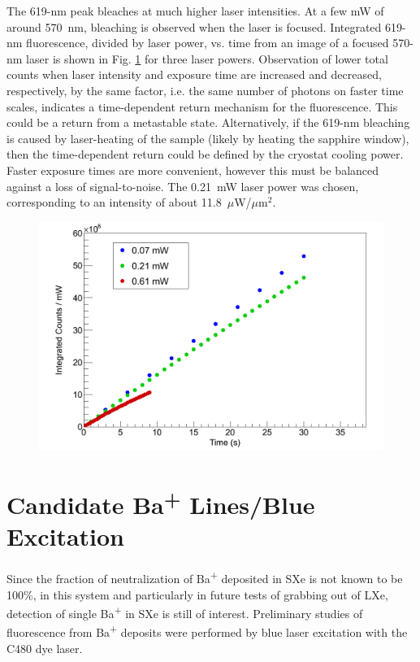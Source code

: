 The 619-nm peak bleaches at much higher laser intensities.  At a few mW of around 570~nm, bleaching is observed when the laser is focused.  Integrated 619-nm fluorescence, divided by laser power, vs. time from an image of a focused 570-nm laser is shown in Fig. \ref{fig:bleaching619} for three laser powers.  Observation of lower total counts when laser intensity and exposure time are increased and decreased, respectively, by the same factor, i.e. the same number of photons on faster time scales, indicates a time-dependent return mechanism for the fluorescence.  This could be a return from a metastable state.  Alternatively, if the 619-nm bleaching is caused by laser-heating of the sample (likely by heating the sapphire window), then the time-dependent return could be defined by the cryostat cooling power.  Faster exposure times are more convenient, however this must be balanced against a loss of signal-to-noise.  The 0.21~mW laser power was chosen, corresponding to an intensity of about 11.8~$\mu$W/$\mu$m$^{2}$.

\begin{figure} %
        \centering
                \includegraphics[width=.7\textwidth]{figures/619_bleach_summed_per_mW.png}
                \caption{}
\label{fig:bleaching619}
\end{figure}


\section{Candidate Ba\textsuperscript{+} Lines/Blue Excitation}
\label{sec:BaPlus}

Since the fraction of neutralization of Ba\textsuperscript{+} deposited in SXe is not known to be 100\%, in this system and particularly in future tests of grabbing out of LXe, detection of single Ba\textsuperscript{+} in SXe is still of interest.  Preliminary studies of fluorescence from Ba\textsuperscript{+} deposits were performed by blue laser excitation with the C480 dye laser.

